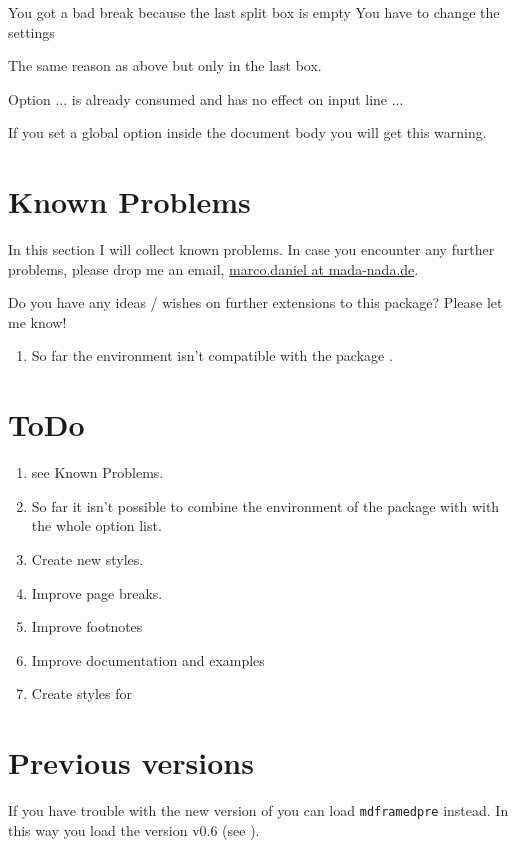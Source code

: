 \documentclass[parskip=false,english,11pt]{ltxmdf}
\begin{document}
\begin{mdexample}
 You got a bad break
 because the last split box is empty
 You have to change the settings
\end{mdexample} 
The same reason as above but only in the last box.


\begin{mdexample}
 Option ... is already consumed
 and has no effect on input line ...
\end{mdexample} 
If you set a global option inside the document
body you will get this warning.

\section{Known Problems}
 In this section I will collect known problems. In case you encounter any further problems, please
 drop me an email, \href{mailto:marco.daniel@mada-nada.de}{marco.daniel at mada-nada.de}.

   Do you have any ideas / wishes on further extensions to this package? Please let me know!

\begin{enumerate}
 \item So far the environment isn't compatible with the package .
\end{enumerate}


\section{ToDo}
\begin{enumerate}
  \item see \glqq Known Problems\grqq.
 \item So far it isn't possible to combine the environment   of the package  with  with the whole option list.
  \item Create new styles.
  \item Improve page breaks.
  \item Improve footnotes
  \item Improve documentation and examples 
  \item Create styles for 
\end{enumerate}                

\section{Previous versions}
If you have trouble with the new version of \mdname you can load \texttt{mdframedpre} instead. In this way you load the version v0.6 (see ).
\end{document}
